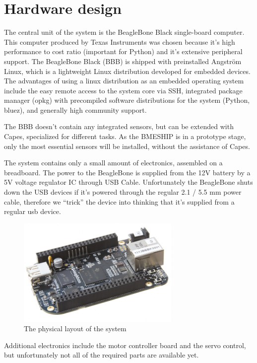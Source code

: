 \section{Hardware design}

The central unit of the system is the BeagleBone Black single-board computer. This computer produced by Texas Instruments was chosen because it's high performance to cost ratio (important for Python) and it's extensive peripheral support.
The BeagleBone Black (BBB) is shipped with preinstalled Angström Linux, which is a lightweight Linux distribution developed for embedded devices. The advantages of using a linux distribution as an embedded operating system include the easy remote access to the system core via SSH, integrated package manager (opkg) with precompiled software distributions for the system (Python, bluez), and generally high community support.

The BBB doesn't contain any integrated sensors, but can be extended with Capes, specialized for different tasks. As the BMESHIP is in a prototype stage, only the most essential sensors will be installed, without the assistance of Capes.

The system contains only a small amount of electronics, assembled on a breadboard. The power to the BeagleBone is supplied from the 12V battery by a 5V voltage regulator IC through USB Cable.
Unfortunately the BeagleBone shuts down the USB devices if it’s powered through the regular 2.1 / 5.5 mm power cable, therefore we “trick” the device into thinking that it’s supplied from a regular usb device.

\begin{figure}[H]
	\centering
	\includegraphics[width=0.7\textwidth]{img2/BeagleBone}
	\caption{The physical layout of the system}
	\label{fig:PhysicalLayout}
\end{figure}

Additional electronics include the motor controller board and the servo control, but unfortunately not all of the required parts are available yet.

